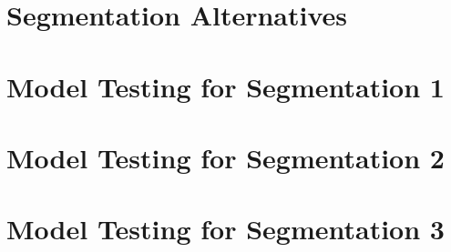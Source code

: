\author{
		Corporate Strategy and Planning Management\\
		Bank of New York Mellon Corporation\\
}



\thispagestyle{empty}
\printtitle									%
  	\vfill
\printauthor
\newpage

\tableofcontents
\thispagestyle{empty}
\newpage

\section{Segmentation Alternatives}



\ifdefined\SegmentOne
\section{Model Testing for Segmentation 1}

\fi

\ifdefined\SegmentTwo
\section{Model Testing for Segmentation 2}

\fi

\ifdefined\SegmentThree
\section{Model Testing for Segmentation 3}

\fi
% 



